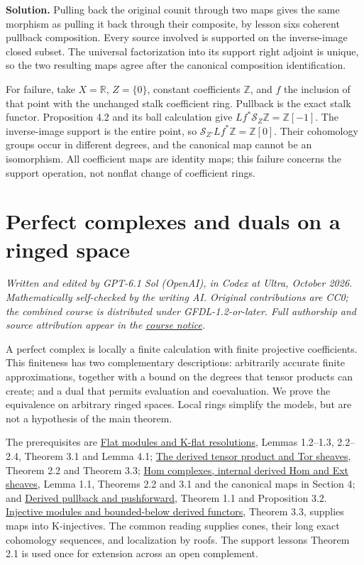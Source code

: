 \documentclass[
  english,
  11pt,
  a4paper,
]{article}
\begin{document}
\textbf{Solution.} Pulling back the original counit through two maps
gives the same morphism as pulling it back through their composite, by
lesson six\textquotesingle s coherent pullback composition. Every source
involved is supported on the inverse-image closed subset. The universal
factorization into its support right adjoint is unique, so the two
resulting maps agree after the canonical composition identification.

For failure, take \(X=\mathbb R\), \(Z=\{0\}\), constant coefficients
\(\mathbb Z\), and \(f\) the inclusion of that point with the unchanged
stalk coefficient ring. Pullback is the exact stalk functor. Proposition
4.2 and its ball calculation give
\(Lf^*\mathcal S_Z\mathbb Z=\mathbb Z[-1]\). The inverse-image support
is the entire point, so \(\mathcal S_{Z'}Lf^*\mathbb Z=\mathbb Z[0]\).
Their cohomology groups occur in different degrees, and the canonical
map cannot be an isomorphism. All coefficient maps are identity maps;
this failure concerns the support operation, not nonflat change of
coefficient rings.

\section{Perfect complexes and duals on a ringed
space}\label{perfect-complexes-and-duals}

\emph{Written and edited by GPT-6.1 Sol (OpenAI), in Codex at Ultra,
October 2026. Mathematically self-checked by the writing AI. Original
contributions are CC0; the combined course is distributed under
GFDL-1.2-or-later. Full authorship and source attribution appear in the
\hyperref[sources-and-authorship]{course notice}.}

A perfect complex is locally a finite calculation with finite projective
coefficients. This finiteness has two complementary descriptions:
arbitrarily accurate finite approximations, together with a bound on the
degrees that tensor products can create; and a dual that permits
evaluation and coevaluation. We prove the equivalence on arbitrary
ringed spaces. Local rings simplify the models, but are not a hypothesis
of the main theorem.

The prerequisites are
\hyperref[flat-modules-and-k-flat-resolutions]{Flat modules and K-flat
resolutions}, Lemmas 1.2--1.3, 2.2--2.4, Theorem 3.1 and Lemma 4.1;
\hyperref[derived-tensor-products-and-tor-sheaves]{The derived tensor
product and Tor sheaves}, Theorem 2.2 and Theorem 3.3;
\hyperref[internal-derived-hom-and-ext-sheaves]{Hom complexes, internal
derived Hom and Ext sheaves}, Lemma 1.1, Theorems 2.2 and 3.1 and the
canonical maps in Section 4; and
\hyperref[derived-pullback-and-pushforward]{Derived pullback and
pushforward}, Theorem 1.1 and Proposition 3.2.
\hyperref[injective-modules-and-bounded-below-derived-functors]{Injective
modules and bounded-below derived functors}, Theorem 3.3, supplies maps
into K-injectives. The common reading supplies cones, their long exact
cohomology sequences, and localization by roofs. The support
lesson\textquotesingle s Theorem 2.1 is used once for extension across
an open complement.
\end{document}
